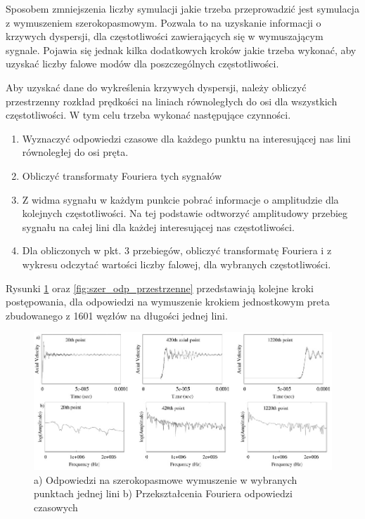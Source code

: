 \vspace{3mm}

Sposobem zmniejszenia liczby symulacji jakie trzeba przeprowadzić jest symulacja z wymuszeniem szerokopasmowym. Pozwala to na uzyskanie informacji o krzywych dyspersji, dla częstotliwości zawierających się w wymuszającym sygnale. Pojawia się jednak kilka dodatkowych kroków jakie trzeba wykonać, aby uzyskać liczby falowe modów dla poszczególnych częstotliwości.

Aby uzyskać dane do wykreślenia krzywych dyspersji, należy obliczyć przestrzenny rozkład prędkości na liniach równoległych do osi dla wszystkich częstotliwości. W tym celu trzeba wykonać następujące czynności.

\begin{enumerate}
  \item Wyznaczyć odpowiedzi czasowe dla każdego punktu na interesującej nas lini równoległej do osi pręta.
  \item Obliczyć transformaty Fouriera tych sygnałów
  \item Z widma sygnału w każdym punkcie pobrać informacje o amplitudzie dla kolejnych częstotliwości. Na tej podstawie odtworzyć amplitudowy przebieg sygnału na całej lini dla każdej interesującej nas częstotliwości.
  \item Dla obliczonych w pkt. 3 przebiegów, obliczyć transformatę Fouriera i z wykresu odczytać wartości liczby falowej, dla wybranych częstotliwości.
\end{enumerate}

Rysunki \ref{fig:szer_odp_czasowe} oraz \ref{fig:szer_odp_przestrzenne} przedstawiają kolejne kroki postępowania, dla odpowiedzi na wymuszenie krokiem jednostkowym preta zbudowanego z 1601 węzłów na długości jednej lini. 

\begin{figure}[h]
\centering
\includegraphics[width=12cm]{Zdjecia/2/widmo_wymuszenia_szerokopasmowe1}
\caption{a) Odpowiedzi na szerokopasmowe wymuszenie w wybranych punktach jednej lini b) Przekształcenia Fouriera odpowiedzi czasowych}
\label{fig:szer_odp_czasowe}
\end{figure}

